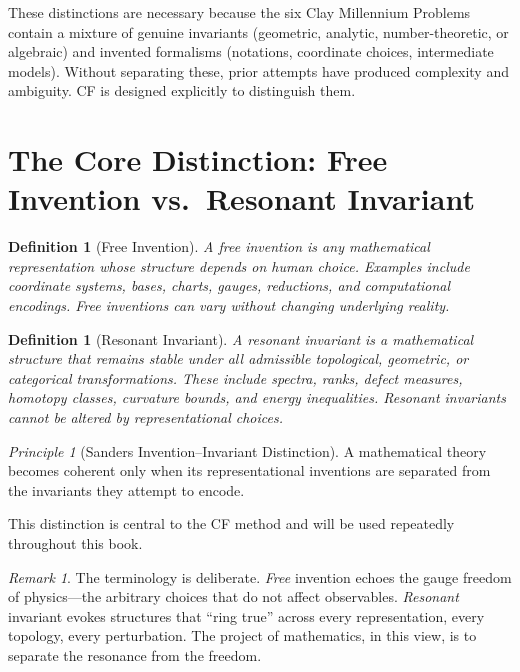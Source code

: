 \documentclass[12pt, openany]{book}
\newtheorem{definition}[theorem]{Definition}
\theoremstyle{remark}
\newtheorem{remark}[theorem]{Remark}
\newtheorem{principle}[theorem]{Principle}
\begin{document}
These distinctions are necessary because the six Clay Millennium Problems contain a
mixture of genuine invariants (geometric, analytic, number-theoretic, or algebraic)
and invented formalisms (notations, coordinate choices, intermediate models).
Without separating these, prior attempts have produced complexity and ambiguity.
CF is designed explicitly to distinguish them.

\section{The Core Distinction: Free Invention vs.\ Resonant Invariant}
\label{sec:found-distinction}

\begin{definition}[Free Invention]\label{def:free-invention}
A \emph{free invention} is any mathematical representation whose structure depends on
human choice. Examples include coordinate systems, bases, charts, gauges, reductions,
and computational encodings. Free inventions can vary without changing underlying reality.
\end{definition}

\begin{definition}[Resonant Invariant]\label{def:resonant-invariant}
A \emph{resonant invariant} is a mathematical structure that remains stable under all
admissible topological, geometric, or categorical transformations. These include spectra,
ranks, defect measures, homotopy classes, curvature bounds, and energy inequalities.
Resonant invariants cannot be altered by representational choices.
\end{definition}

\begin{principle}[Sanders Invention--Invariant Distinction]\label{princ:inv-dist}
A mathematical theory becomes coherent only when its representational inventions are
separated from the invariants they attempt to encode.
\end{principle}

\noindent
This distinction is central to the CF method and will be used repeatedly throughout
this book.

\begin{remark}
The terminology is deliberate. \emph{Free} invention echoes the gauge freedom of
physics---the arbitrary choices that do not affect observables. \emph{Resonant}
invariant evokes structures that ``ring true'' across every representation, every
topology, every perturbation. The project of mathematics, in this view, is to
separate the resonance from the freedom.
\end{remark}
\end{document}
